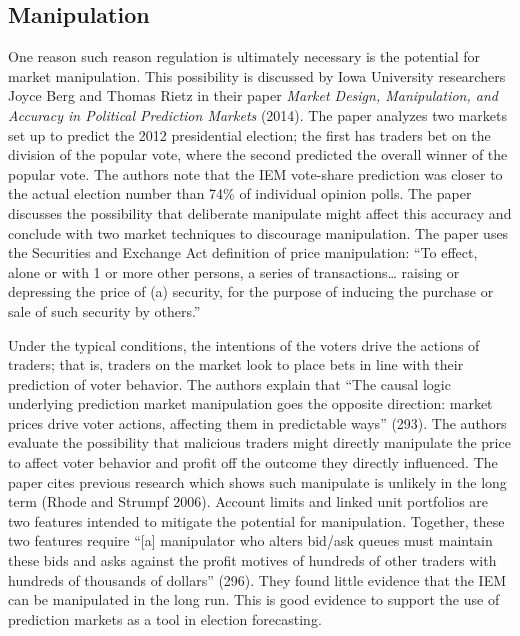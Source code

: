 \documentclass[11pt,]{article}
\begin{document}
\hypertarget{manipulation}{%
\subsection{Manipulation}\label{manipulation}}

One reason such reason regulation is ultimately necessary is the
potential for market manipulation. This possibility is discussed by Iowa
University researchers Joyce Berg and Thomas Rietz in their paper
\emph{Market Design, Manipulation, and Accuracy in Political Prediction
Markets} (2014). The paper analyzes two markets set up to predict the
2012 presidential election; the first has traders bet on the division of
the popular vote, where the second predicted the overall winner of the
popular vote. The authors note that the IEM vote-share prediction was
closer to the actual election number than 74\% of individual opinion
polls. The paper discusses the possibility that deliberate manipulate
might affect this accuracy and conclude with two market techniques to
discourage manipulation. The paper uses the Securities and Exchange Act
definition of price manipulation: ``To effect, alone or with 1 or more
other persons, a series of transactions\ldots{} raising or depressing
the price of (a) security, for the purpose of inducing the purchase or
sale of such security by others.''

Under the typical conditions, the intentions of the voters drive the
actions of traders; that is, traders on the market look to place bets in
line with their prediction of voter behavior. The authors explain that
``The causal logic underlying prediction market manipulation goes the
opposite direction: market prices drive voter actions, affecting them in
predictable ways'' (293). The authors evaluate the possibility that
malicious traders might directly manipulate the price to affect voter
behavior and profit off the outcome they directly influenced. The paper
cites previous research which shows such manipulate is unlikely in the
long term (Rhode and Strumpf 2006). Account limits and linked unit
portfolios are two features intended to mitigate the potential for
manipulation. Together, these two features require ``{[}a{]} manipulator
who alters bid/ask queues must maintain these bids and asks against the
profit motives of hundreds of other traders with hundreds of thousands
of dollars'' (296). They found little evidence that the IEM can be
manipulated in the long run. This is good evidence to support the use of
prediction markets as a tool in election forecasting.
\end{document}
